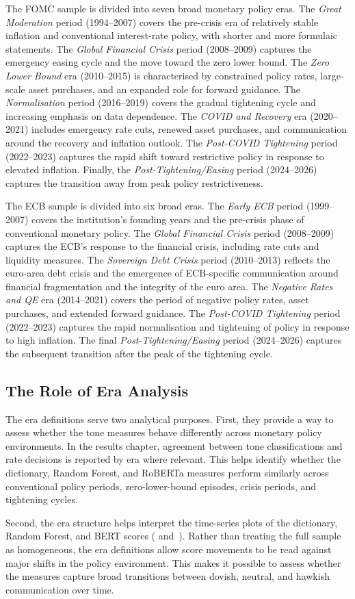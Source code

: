The FOMC sample is divided into seven broad monetary policy eras. The
\emph{Great Moderation} period (1994--2007) covers the pre-crisis era of
relatively stable inflation and conventional interest-rate policy, with
shorter and more formulaic statements. The \emph{Global Financial Crisis}
period (2008--2009) captures the emergency easing cycle and the move
toward the zero lower bound. The \emph{Zero Lower Bound} era
(2010--2015) is characterised by constrained policy rates, large-scale
asset purchases, and an expanded role for forward guidance. The
\emph{Normalisation} period (2016--2019) covers the gradual tightening
cycle and increasing emphasis on data dependence. The \emph{COVID and
Recovery} era (2020--2021) includes emergency rate cuts, renewed asset
purchases, and communication around the recovery and inflation outlook.
The \emph{Post-COVID Tightening} period (2022--2023) captures the rapid
shift toward restrictive policy in response to elevated inflation.
Finally, the \emph{Post-Tightening/Easing} period (2024--2026) captures
the transition away from peak policy restrictiveness.

The ECB sample is divided into six broad eras. The \emph{Early ECB}
period (1999--2007) covers the institution's founding years and the
pre-crisis phase of conventional monetary policy. The \emph{Global
Financial Crisis} period (2008--2009) captures the ECB's response to the
financial crisis, including rate cuts and liquidity measures. The
\emph{Sovereign Debt Crisis} period (2010--2013) reflects the euro-area
debt crisis and the emergence of ECB-specific communication around
financial fragmentation and the integrity of the euro area. The
\emph{Negative Rates and QE} era (2014--2021) covers the period of
negative policy rates, asset purchases, and extended forward guidance.
The \emph{Post-COVID Tightening} period (2022--2023) captures the rapid
normalisation and tightening of policy in response to high inflation.
The final \emph{Post-Tightening/Easing} period (2024--2026) captures the
subsequent transition after the peak of the tightening cycle.


\subsection{The Role of Era Analysis}
\label{sec:inst_eras_role}

The era definitions serve two analytical purposes. First, they provide a
way to assess whether the tone measures behave differently across
monetary policy environments. In the results chapter, agreement between
tone classifications and rate decisions is reported by era where
relevant. This helps identify whether the dictionary, Random Forest, and
RoBERTa measures perform similarly across conventional policy periods,
zero-lower-bound episodes, crisis periods, and tightening cycles.

Second, the era structure helps interpret the time-series plots of the
dictionary, Random Forest, and BERT scores
( and~). Rather than
treating the full sample as homogeneous, the era definitions allow score
movements to be read against major shifts in the policy environment. This
makes it possible to assess whether the measures capture broad
transitions between dovish, neutral, and hawkish communication over time.